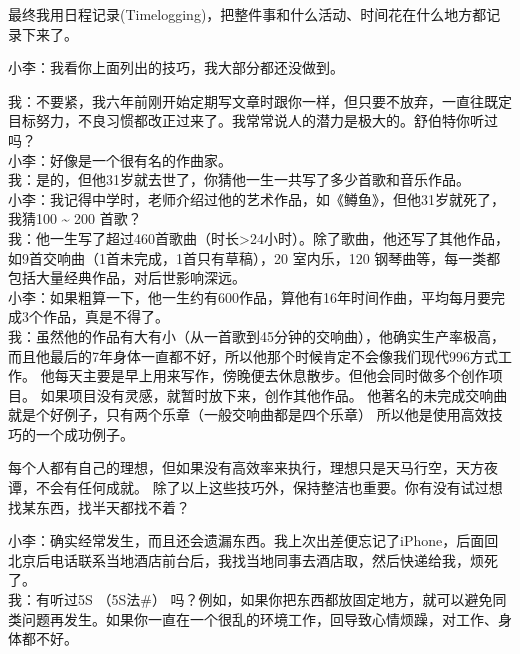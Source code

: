 
最终我用日程记录(Timelogging)，把整件事和什么活动、时间花在什么地方都记录下来了。

小李：我看你上面列出的技巧，我大部分都还没做到。

我：不要紧，我六年前刚开始定期写文章时跟你一样，但只要不放弃，一直往既定目标努力，不良习惯都改正过来了。我常常说人的潜力是极大的。舒伯特你听过吗？\\
小李：好像是一个很有名的作曲家。\\
我：是的，但他31岁就去世了，你猜他一生一共写了多少首歌和音乐作品。\\
小李：我记得中学时，老师介绍过他的艺术作品，如《鳟鱼》，但他31岁就死了，我猜100 \textasciitilde{} 200 首歌？\\
我：他一生写了超过460首歌曲（时长\textgreater{}24小时）。除了歌曲，他还写了其他作品，如9首交响曲（1首未完成，1首只有草稿），20
室内乐，120 钢琴曲等，每一类都包括大量经典作品，对后世影响深远。\\
小李：如果粗算一下，他一生约有600作品，算他有16年时间作曲，平均每月要完成3个作品，真是不得了。\\
我：虽然他的作品有大有小（从一首歌到45分钟的交响曲），他确实生产率极高，而且他最后的7年身体一直都不好，所以他那个时候肯定不会像我们现代996方式工作。
他每天主要是早上用来写作，傍晚便去休息散步。但他会同时做多个创作项目。
如果项目没有灵感，就暂时放下来，创作其他作品。
他著名的未完成交响曲就是个好例子，只有两个乐章（一般交响曲都是四个乐章）
所以他是使用高效技巧的一个成功例子。

每个人都有自己的理想，但如果没有高效率来执行，理想只是天马行空，天方夜谭，不会有任何成就。
除了以上这些技巧外，保持整洁也重要。你有没有试过想找某东西，找半天都找不着？

小李：确实经常发生，而且还会遗漏东西。我上次出差便忘记了iPhone，后面回北京后电话联系当地酒店前台后，我找当地同事去酒店取，然后快递给我，烦死了。\\
我：有听过5S （5S法\#）
吗？例如，如果你把东西都放固定地方，就可以避免同类问题再发生。如果你一直在一个很乱的环境工作，回导致心情烦躁，对工作、身体都不好。

\begin{description}
\item[]
\end{description}

